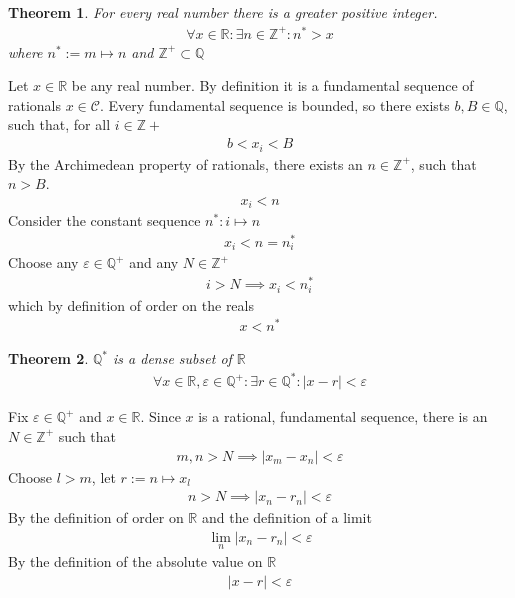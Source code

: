 \documentclass{amsart}
\numberwithin{equation}{section}
\let\oldendproof\endproof
\renewenvironment{proof}[1][\proofname]{%
  \setcounter{case}{0}
  \setcounter{step}{0}
  \oldproof[#1]%
}{\oldendproof}
\theoremstyle{plain}
\newtheorem{theorem}{Theorem}[section]
\theoremstyle{definition}
\theoremstyle{remark}
\begin{document}
\begin{theorem}%
  For every real number there is a greater positive integer.
  \begin{align}
    \forall x\in\mathbb{R}: \exists n \in \mathbb{Z}^+: n^* > x 
  \end{align}
  where $n^*:= m \mapsto n$ and $\mathbb{Z}^+ \subset \mathbb{Q}$
\end{theorem}
\begin{proof}
  Let $x\in\mathbb{R}$ be any real number.
  By definition it is a fundamental sequence of rationals $x\in\mathcal{C}$.
  Every fundamental sequence is bounded, so there exists $b,B\in\mathbb{Q}$, such that, for all $i\in\mathbb{Z}+$
  \begin{align}
    b < x_i < B
  \end{align}
  By the Archimedean property of rationals, there exists an $n\in\mathbb{Z}^+$, such that $n>B$.
  \begin{align}
    x_i < n
  \end{align}
  Consider the constant sequence $n^*: i \mapsto n$
  \begin{align}
    x_i < n = n^*_i
  \end{align}
  Choose any $\varepsilon \in\mathbb{Q}^+$ and any $N\in\mathbb{Z}^+$
  \begin{align}
    i > N \implies x_i < n_i^*
  \end{align}
  which by definition of order on the reals
  \begin{align}
    x< n^*
  \end{align}
\end{proof}

\begin{theorem}
  $\mathbb{Q}^*$ is a dense subset of $\mathbb{R}$
  \begin{align}
    \forall x \in \mathbb{R}, \varepsilon \in \mathbb{Q}^+: \exists r \in \mathbb{Q}^*: |x - r | < \varepsilon
  \end{align}
\end{theorem}
\begin{proof}
  Fix $\varepsilon\in \mathbb{Q}^+$ and $x \in\mathbb{R}$.
  Since $x$ is a rational, fundamental sequence, there is an $N\in\mathbb{Z}^+$ such that
  \begin{align}
    m,n > N \implies |x_m - x_n | < \varepsilon
  \end{align}
  Choose $l>m$, let $r:= n \mapsto x_l$
  \begin{align}
    n> N \implies |x_n - r_n| < \varepsilon
  \end{align}
  By the definition of order on $\mathbb{R}$ and the definition of a limit
  \begin{align}
    \lim_n |x_n - r_n | < \varepsilon
  \end{align}
  By the definition of the absolute value on $\mathbb{R}$
  \begin{align}
    |x- r| < \varepsilon
  \end{align}
\end{proof}
\end{document}
